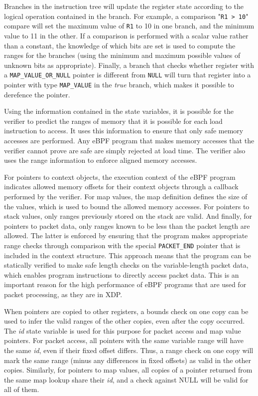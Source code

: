 \documentclass[10pt,sigconf,anonymous]{acmart}
\begin{document}
Branches in the instruction tree will update the register state according to the
logical operation contained in the branch. For example, a comparison "\texttt{R1
  > 10}" compare will set the maximum value of \texttt{R1} to 10 in one branch,
and the minimum value to 11 in the other. If a comparison is performed with a
scalar value rather than a constant, the knowledge of which bits are set is used
to compute the ranges for the branches (using the minimum and maximum possible
values of unknown bits as appropriate). Finally, a branch that checks whether
register with a \texttt{MAP\_VALUE\_OR\_NULL} pointer is different from
\texttt{NULL} will turn that register into a pointer with type
\texttt{MAP\_VALUE} in the \emph{true} branch, which makes it possible to
derefence the pointer.

Using the information contained in the state variables, it is possible for the
verifier to predict the ranges of memory that it is possible for each load
instruction to access. It uses this information to ensure that only safe memory
accesses are performed. Any eBPF program that makes memory accesses that the
verifier cannot prove are safe are simply rejected at load time. The verifier
also uses the range information to enforce aligned memory accesses.

For pointers to context objects, the execution context of the eBPF program
indicates allowed memory offsets for their context objects through a callback
performed by the verifier. For map values, the map definition defines the size
of the values, which is used to bound the allowed memory accesses. For pointers
to stack values, only ranges previously stored on the stack are valid. And
finally, for pointers to packet data, only ranges known to be less than the
packet length are allowed. The latter is enforced by ensuring that the program
makes appropriate range checks through comparison with the special
\texttt{PACKET\_END} pointer that is included in the context structure. This
approach means that the program can be statically verified to make safe length
checks on the variable-length packet data, which enables program instructions to
directly access packet data. This is an important reason for the high
performance of eBPF programs that are used for packet processing, as they are in
XDP.

When pointers are copied to other registers, a bounds check on one copy can be
used to infer the valid ranges of the other copies, even after the copy
occurred. The \emph{id} state variable is used for this purpose for packet access and
map value pointers. For packet access, all pointers with the same variable
range will have the same \emph{id}, even if their fixed offset differs. Thus, a range
check on one copy will mark the same range (minus any differences in fixed
offsets) as valid in the other copies. Similarly, for pointers to map values,
all copies of a pointer returned from the same map lookup share their \emph{id}, and
a check against NULL will be valid for all of them.
\end{document}
